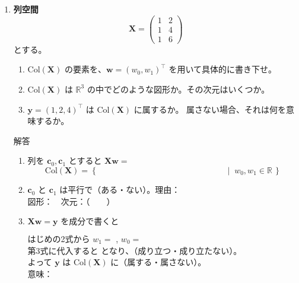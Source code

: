 \documentclass[a4paper,dvipdfmx]{jsarticle}
\newcommand{\提出期限}{2026年10月12日（月）}
\newcommand{\学籍番号}{0000000}
\newcommand{\氏名}{氏名を書く}
\newcommand{\提出日}{2026年10月12日}
\newenvironment{answer}{\begin{itembox}[l]{解答}}{\end{itembox}}
\begin{document}
\begin{enumerate}
  \item \textbf{列空間}\quad
    \begin{equation*}
      \bm{X} = \begin{pmatrix} 1 & 2 \\ 1 & 4 \\ 1 & 6 \end{pmatrix}
    \end{equation*}
    とする。
    \begin{enumerate}
      \item $\mathrm{Col}(\bm{X})$ の要素を、$\bm{w} = (w_0, w_1)^\top$ を用いて具体的に書き下せ。
      \item $\mathrm{Col}(\bm{X})$ は $\mathbb{R}^3$ の中でどのような図形か。その次元はいくつか。
      \item $\bm{y} = (1, 2, 4)^\top$ は $\mathrm{Col}(\bm{X})$ に属するか。
        属さない場合、それは何を意味するか。
    \end{enumerate}
    \begin{answer}
      \begin{enumerate}
        \item 列を $\bm{c}_0, \bm{c}_1$ とすると $\bm{X}\bm{w} = $
          \begin{equation*}
            \mathrm{Col}(\bm{X}) = \left\{\, \phantom{XXXXXXXXXXXXXXXXXX}
              \;\middle|\; w_0, w_1 \in \mathbb{R} \,\right\}
          \end{equation*}
        \item $\bm{c}_0$ と $\bm{c}_1$ は平行で（ある・ない）。理由：\\[1mm]
          図形：\phantom{XXXXXXXXXXXXXXXX}　次元：（　　）
        \item $\bm{X}\bm{w} = \bm{y}$ を成分で書くと
          \begin{equation*}
            \phantom{XXXXXXXXXXXXXXXXXXXXXXXXXXXXXXXX}
          \end{equation*}
          はじめの2式から $w_1 = $ \phantom{XXX}, $w_0 = $ \phantom{XXX} \\
          第3式に代入すると \phantom{XXXXXXXXXX} となり、（成り立つ・成り立たない）。\\[1mm]
          よって $\bm{y}$ は $\mathrm{Col}(\bm{X})$ に（属する・属さない）。\\
          意味：
      \end{enumerate}
    \end{answer}


\end{enumerate}
\end{document}
